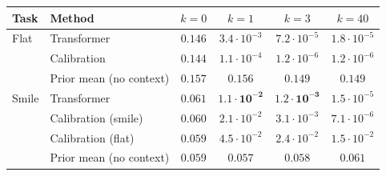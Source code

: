 \begin{tabular}{llcccc}
\toprule
Task & Method & $k=0$ & $k=1$ & $k=3$ & $k=40$ \\
\midrule
Flat & Transformer & $0.146$ & $3.4\cdot10^{-3}$ & $7.2\cdot10^{-5}$ & $1.8\cdot10^{-5}$ \\
 & Calibration & $0.144$ & $1.1\cdot10^{-4}$ & $1.2\cdot10^{-6}$ & $1.2\cdot10^{-6}$ \\
 & Prior mean (no context) & $0.157$ & $0.156$ & $0.149$ & $0.149$ \\
\midrule
Smile & Transformer & $0.061$ & $\mathbf{1.1\cdot10^{-2}}$ & $\mathbf{1.2\cdot10^{-3}}$ & $1.5\cdot10^{-5}$ \\
 & Calibration (smile) & $0.060$ & $2.1\cdot10^{-2}$ & $3.1\cdot10^{-3}$ & $7.1\cdot10^{-6}$ \\
 & Calibration (flat) & $0.059$ & $4.5\cdot10^{-2}$ & $2.4\cdot10^{-2}$ & $1.5\cdot10^{-2}$ \\
 & Prior mean (no context) & $0.059$ & $0.057$ & $0.058$ & $0.061$ \\
\bottomrule
\end{tabular}
